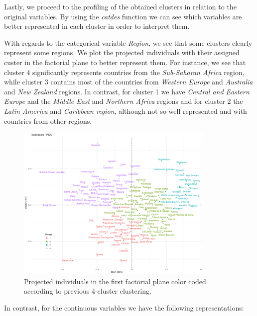 \documentclass[12pt]{extarticle}
\begin{document}
Lastly, we proceed to the profiling of the obtained clusters in relation to the original variables. By using the \textit{catdes} function we can see which variables are better represented in each cluster in order to interpret them. 

With regards to the categorical variable \textit{Region}, we see that some clusters clearly represent some regions. We plot the projected individuals with their assigned custer in the factorial plane to better represent them. For instance, we see that cluster 4 significantly represents countries from the \textit{Sub-Saharan Africa} region, while cluster 3 contains most of the countries from \textit{Western Europe} and \textit{Australia} and \textit{New Zealand} regions. In contrast, for cluster 1 we have \textit{Central and Eastern Europe} and the \textit{Middle East} and \textit{Northern Africa} regions and for cluster 2 the \textit{Latin America} and \textit{Caribbean region}, although not so well represented and with countries from other regions.

\begin{figure}[H]
  \centering
    \includegraphics[width=0.85\textwidth]{figures/pca_individuals_clustering.png}
    \caption{Projected individuals in the first factorial plane color coded according to previous 4-cluster clustering.\label{fig:pca_ind}}
\end{figure}

In contrast, for the continuous variables we have the following representations:
\end{document}
